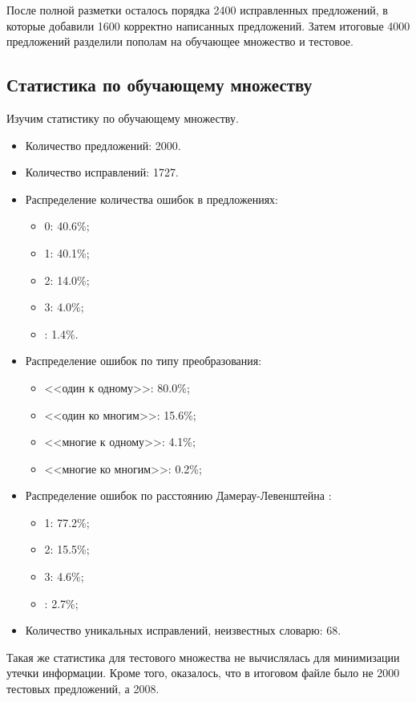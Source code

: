 После полной разметки осталось порядка 2400 исправленных предложений, в которые добавили 1600 корректно написанных предложений. Затем итоговые 4000 предложений разделили пополам на обучающее множество и тестовое.

\subsection{Статистика по обучающему множеству}

Изучим статистику по обучающему множеству.
\begin{itemize}
	\item Количество предложений: 2000.
	\item Количество исправлений: 1727.
	\item Распределение количества ошибок в предложениях:
	\begin{itemize}
		\item 0: 40.6\%;
		\item 1: 40.1\%;
		\item 2: 14.0\%;
		\item 3: 4.0\%;
		\item {}: 1.4\%.
	\end{itemize}
	\item Распределение ошибок по типу преобразования:
	\begin{itemize}
		\item <<один к одному>>: 80.0\%;
		\item <<один ко многим>>: 15.6\%;
		\item <<многие к одному>>: 4.1\%;
		\item <<многие ко многим>>: 0.2\%;
	\end{itemize}
	\item Распределение ошибок по расстоянию Дамерау-Левенштейна \cite{Damerau1964} \cite{Levenshtein1965}:
	\begin{itemize}
		\item 1: 77.2\%;
		\item 2: 15.5\%;
		\item 3: 4.6\%;
		\item {}: 2.7\%;
	\end{itemize}
	\item Количество уникальных исправлений, неизвестных словарю: 68.
\end{itemize}

Такая же статистика для тестового множества не вычислялась для минимизации утечки информации. Кроме того, оказалось, что в итоговом файле было не 2000 тестовых предложений, а 2008.

